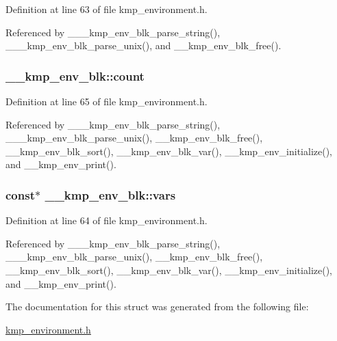 Definition at line 63 of file kmp\-\_\-environment.\-h.



Referenced by \-\_\-\-\_\-\-\_\-kmp\-\_\-env\-\_\-blk\-\_\-parse\-\_\-string(), \-\_\-\-\_\-\-\_\-kmp\-\_\-env\-\_\-blk\-\_\-parse\-\_\-unix(), and \-\_\-\-\_\-kmp\-\_\-env\-\_\-blk\-\_\-free().

\hypertarget{struct____kmp__env__blk_a857a76ec0e363dbd587b0f5f0b57c886}{
\subsubsection[{count}]{ \-\_\-\-\_\-kmp\-\_\-env\-\_\-blk\-::count}}\label{struct____kmp__env__blk_a857a76ec0e363dbd587b0f5f0b57c886}


Definition at line 65 of file kmp\-\_\-environment.\-h.



Referenced by \-\_\-\-\_\-\-\_\-kmp\-\_\-env\-\_\-blk\-\_\-parse\-\_\-string(), \-\_\-\-\_\-\-\_\-kmp\-\_\-env\-\_\-blk\-\_\-parse\-\_\-unix(), \-\_\-\-\_\-kmp\-\_\-env\-\_\-blk\-\_\-free(), \-\_\-\-\_\-kmp\-\_\-env\-\_\-blk\-\_\-sort(), \-\_\-\-\_\-kmp\-\_\-env\-\_\-blk\-\_\-var(), \-\_\-\-\_\-kmp\-\_\-env\-\_\-initialize(), and \-\_\-\-\_\-kmp\-\_\-env\-\_\-print().

\hypertarget{struct____kmp__env__blk_af6ab63dec994b80f1d4029b447b6e435}{
\subsubsection[{vars}]{ const$\ast$ \-\_\-\-\_\-kmp\-\_\-env\-\_\-blk\-::vars}}\label{struct____kmp__env__blk_af6ab63dec994b80f1d4029b447b6e435}


Definition at line 64 of file kmp\-\_\-environment.\-h.



Referenced by \-\_\-\-\_\-\-\_\-kmp\-\_\-env\-\_\-blk\-\_\-parse\-\_\-string(), \-\_\-\-\_\-\-\_\-kmp\-\_\-env\-\_\-blk\-\_\-parse\-\_\-unix(), \-\_\-\-\_\-kmp\-\_\-env\-\_\-blk\-\_\-free(), \-\_\-\-\_\-kmp\-\_\-env\-\_\-blk\-\_\-sort(), \-\_\-\-\_\-kmp\-\_\-env\-\_\-blk\-\_\-var(), \-\_\-\-\_\-kmp\-\_\-env\-\_\-initialize(), and \-\_\-\-\_\-kmp\-\_\-env\-\_\-print().



The documentation for this struct was generated from the following file\-:\begin{DoxyCompactItemize}
\item 
\hyperlink{kmp__environment_8h}{kmp\-\_\-environment.\-h}\end{DoxyCompactItemize}
